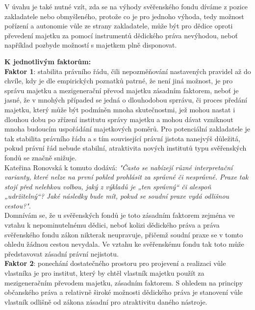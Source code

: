 \documentclass{article}
\begin{document}
V úvahu je také nutné vzít, zda se na výhody svěřenského fondu díváme z pozice zakladatele nebo obmyšleného, protože co je pro jednoho výhoda, tedy možnost pořízení a autonomie vůle ze strany zakladatele, může být pro dědice oproti převedení majetku za pomocí instrumentů dědického práva nevýhodou, neboť například pozbyde možností s majetkem plně disponovat. \\

\newpage

\textbf{K jednotlivým faktorům:}\\

\textbf{Faktor 1}: stabilita právního řádu, čili nepozměňování nastavených pravidel až do chvíle, kdy je dle empirických poznatků patrné, že není jiná možnost, je pro správu majetku a mezigenerační převod majetku zásadním faktorem, neboť je jasné, že v mnohých případed se jedná o dlouhodobou sprrávu, či proces předání majetku, který může být podmíněn mnoha skutečnostmi, jež mohou nastat i dlouhou dobu po zřízení institutu správy majetku a mohou dávat vzniknout mnoha budoucím uspořádání majetkových poměrů. Pro potenciální zakladatele je tak stabilita právního řádu a s tím související právní jistota nanejvýš důležitá, pokud právní řád nebude stabilní, atraktivita nových institutů typu svěřenských fondů se značně snižuje.\\

Kateřina Ronovská k tomuto dodává: \textit{"Často se nabízejí různé interpretační varianty, které nelze na první pohled prohlásit za správné či nesprávné. Praxe tak stojí před nelehkou volbou, jaký z výkladů je „ten správný“ či alespoň „udržitelný“? Jaké následky bude mít, pokud se soudní praxe vydá odlišnou cestou?"}.\\

Domnívám se, že u svěřenských fondů je toto zásadním faktorem zejména ve vztahu k nepominutelnému dědici, neboť kolizi dědického práva a práva svěřenského fondu zákon nikterak neupravuje, přičemž soudní praxe se v tomto ohledu žádnou cestou nevydala. Ve vztahu ke svěřenskému fondu tak toto může představovat zásadní právní nejistotu.\\

\textbf{Faktor 2}: ponechání dostatečného prostoru pro projevení a realizaci vůle vlastníka je pro institut, který by chtěl vlastník majetku použít za mezigeneračním převodem majetku, zásadním faktorem. S ohledem na principy občanského práva a relativně široké možnosti dědického práva je stanovení vůle vlastník odlišně od zákona zásadní pro atraktivitu daného nástroje.\\
\end{document}
